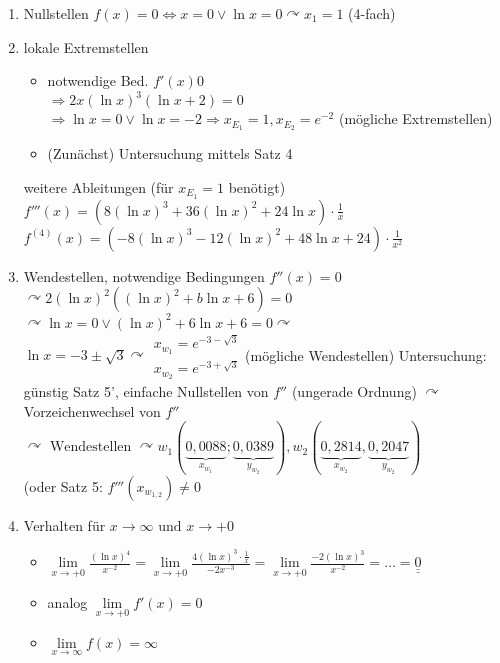\documentclass[a4paper]{scrartcl}
\begin{document}
\begin{enumerate}
\item Nullstellen $f(x) = 0 \Leftrightarrow x = 0 \vee \ln{x} = 0 \curvearrowright x_1 = 1$ (4-fach)
\item lokale Extremstellen
\begin{itemize}
\item notwendige Bed. $f'(x) 0$\\
$\Rightarrow 2x(\ln{x})^3 ( \ln{x} + 2) = 0$\\
$\Rightarrow \ln{x} = 0 \vee \ln{x} = -2 \Rightarrow x_{E_1} = 1, x_{E_2} = e^{-2}$ (mögliche Extremstellen)
\item (Zunächst) Untersuchung mittels Satz 4
\end{itemize}
weitere Ableitungen (für $x_{E_1} = 1$ benötigt)\\
$f'''(x) = (8 (\ln{x})^3 + 36 ( \ln{x})^2 + 24 \ln{x} ) \cdot \frac{1}{x}$\\
$f^{(4)} (x) = (-8 (\ln{x})^3 - 12(\ln{x})^2 + 48 \ln{x} + 24)\cdot \frac{1}{x^2}$
\item Wendestellen, notwendige Bedingungen $f''(x) = 0$\\
$\curvearrowright 2(\ln{x})^2 ((\ln{x})^2 + b \ln{x} + 6) = 0$\\
$\curvearrowright \ln{x} = 0 \vee (\ln{x})^2 + 6 \ln{x} + 6 = 0 \curvearrowright$\\
$\ln{x} = -3 \pm \sqrt{3} \curvearrowright \begin{array}{c} x_{w_1} = e^{-3 - \sqrt{3}} \\ x_{w_2} = e^{-3+ \sqrt{3}} \end{array}$(mögliche Wendestellen)
Untersuchung: günstig Satz 5', einfache Nullstellen von $f''$ (ungerade Ordnung) $\curvearrowright$ Vorzeichenwechsel von $f''$\\
$\curvearrowright \text{ Wendestellen } \curvearrowright w_1(\underbrace{0,0088}_{x_{w_1}};\underbrace{0,0389}_{y_{w_2}}), w_2(\underbrace{0,2814}_{x_{w_2}},\underbrace{0,2047}_{y_{w_2}})$\\
(oder Satz 5: $f'''(x_{w_{1,2}}) \neq 0$
\item Verhalten für $x \to  \infty \text{ und } x \to +0$
\begin{itemize}
\item $\lim\limits_{x \to +0} \frac{(\ln{x})^4}{x^{-2}} = \lim\limits_{x \to +0} \frac{4(\ln{x})^3 \cdot \frac{1}{x}}{-2 x^{-3}} = \lim\limits_{x \to +0} \frac{-2(\ln{x})^3}{x^{-2}} = \dots = \underline{\underline{0}}$
\item analog $\lim\limits_{x \to +0} f'(x) = 0$
\item $\lim\limits_{x \to \infty} f(x) = \infty$
\end{itemize}
\end{enumerate}
\end{document}
